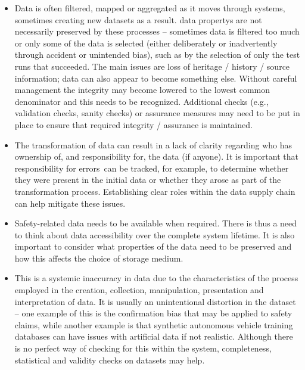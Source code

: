 \begin{itemize}
  \item {} Data is often filtered, mapped or aggregated as it moves through systems, sometimes creating new \glspl{dataset} as a result. \Glspl{data property} are not necessarily preserved by these processes -- sometimes data is filtered too much or only some of the data is selected (either deliberately or inadvertently through accident or unintended bias), such as by the selection of only the test runs that succeeded. The main issues are loss of heritage / history / source \gls{information}; data can also appear to become something else. Without careful management the \gls{integrity} may become lowered to the lowest common denominator and this needs to be recognized. Additional checks (e.g., \gls{validation} checks, sanity checks) or assurance measures may need to be put in place to ensure that required \gls{integrity} / assurance is maintained.

  \item {} The transformation of data can result in a lack of clarity regarding who has ownership of, and responsibility for, the data (if anyone). It is important that responsibility for \cbstart\glspl{error}\cbend\ can be tracked, for example, to determine whether they were present in the initial data or whether they arose as part of the transformation process. Establishing clear roles within the data supply chain can help mitigate these issues.

  \item {} Safety-related data needs to be available when required. There is thus a need to think about data accessibility over the complete system lifetime. It is also important to consider what properties of the data need to be preserved and how this affects the choice of storage medium.

  \item {} This is a systemic inaccuracy in data due to the characteristics of the process employed in the creation, collection, manipulation, presentation and interpretation of data. It is usually an unintentional distortion in the \gls{dataset} -- one example of this is the confirmation bias that may be applied to safety claims,
    while another example is that synthetic autonomous vehicle training \glspl{database} can have issues with artificial data if not realistic.
    Although there is no perfect way of checking for this within the system, \gls{completeness}, statistical and validity checks on \glspl{dataset} may help.


\end{itemize}
